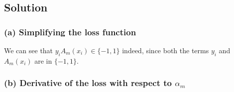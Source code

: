 \subsection*{Solution}

\subsubsection*{(a) Simplifying the loss function}

We can see that \( y_{i} A_{m}\left(x_{i}\right) \in \{-1,1\} \) indeed, since both the terms \( y_{i} \) and \( A_{m}\left(x_{i}\right) \) are in \( \{-1,1\} \).

\subsubsection*{(b) Derivative of the loss with respect to \( \alpha_{m} \)}
